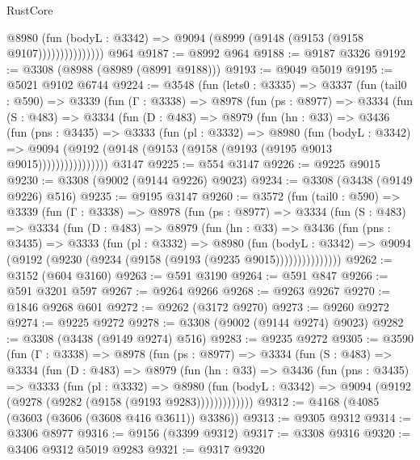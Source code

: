 \begin{lexlean}{RustCore}
\begin{coremodule}
                      @8980
                        (fun (bodyL : @3342) =>
                        @9094 (@8999 (@9148 (@9153 (@9158 @9107)))))))))))))))
    @964
@9187 := @8992 @964
@9188 := @9187 @3326
@9192 := @3308 (@8988 (@8989 (@8991 @9188)))
@9193 := @9049 @5019
@9195 := @5021 @9102 @6744
@9224 := @3548
    (fun (lets0 : @3335) =>
    @3337
      (fun (tail0 : @590) =>
      @3339
        (fun (Γ : @3338) =>
        @8978
          (fun (ps : @8977) =>
          @3334
            (fun (S : @483) =>
            @3334
              (fun (D : @483) =>
              @8979
                (fun (hn : @33) =>
                @3436
                  (fun (pns : @3435) =>
                  @3333
                    (fun (pl : @3332) =>
                    @8980
                      (fun (bodyL : @3342) =>
                      @9094 (@9192 (@9148 (@9153 (@9158 (@9193 (@9195 @9013 @9015))))))))))))))))
    @3147
@9225 := @554 @3147
@9226 := @9225 @9015
@9230 := @3308 (@9002 (@9144 @9226) @9023)
@9234 := @3308 (@3438 (@9149 @9226) @516)
@9235 := @9195 @3147
@9260 := @3572
    (fun (tail0 : @590) =>
    @3339
      (fun (Γ : @3338) =>
      @8978
        (fun (ps : @8977) =>
        @3334
          (fun (S : @483) =>
          @3334
            (fun (D : @483) =>
            @8979
              (fun (hn : @33) =>
              @3436
                (fun (pns : @3435) =>
                @3333
                  (fun (pl : @3332) =>
                  @8980
                    (fun (bodyL : @3342) =>
                    @9094 (@9192 (@9230 (@9234 (@9158 (@9193 (@9235 @9015)))))))))))))))
@9262 := @3152 (@604 @3160)
@9263 := @591 @3190
@9264 := @591 @847
@9266 := @591 @3201 @597
@9267 := @9264 @9266
@9268 := @9263 @9267
@9270 := @1846 @9268 @601
@9272 := @9262 (@3172 @9270)
@9273 := @9260 @9272
@9274 := @9225 @9272
@9278 := @3308 (@9002 (@9144 @9274) @9023)
@9282 := @3308 (@3438 (@9149 @9274) @516)
@9283 := @9235 @9272
@9305 := @3590
    (fun (Γ : @3338) =>
    @8978
      (fun (ps : @8977) =>
      @3334
        (fun (S : @483) =>
        @3334
          (fun (D : @483) =>
          @8979
            (fun (hn : @33) =>
            @3436
              (fun (pns : @3435) =>
              @3333
                (fun (pl : @3332) =>
                @8980
                  (fun (bodyL : @3342) =>
                  @9094 (@9192 (@9278 (@9282 (@9158 (@9193 @9283)))))))))))))
@9312 := @4168 (@4085 (@3603 (@3606 (@3608 @416 @3611)) @3386))
@9313 := @9305 @9312
@9314 := @3306 @8977
@9316 := @9156 (@3399 @9312)
@9317 := @3308 @9316
@9320 := @3406 @9312 @5019 @9283
@9321 := @9317 @9320

\end{coremodule}
\end{lexlean}
